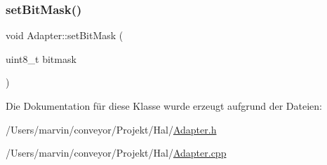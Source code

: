 \hypertarget{class_adapter_adff950a92be7f52dbe08ff3af766a562}{}\label{class_adapter_adff950a92be7f52dbe08ff3af766a562} 
\subsubsection{\texorpdfstring{set\+Bit\+Mask()}{setBitMask()}}
{\footnotesize\ttfamily void Adapter\+::set\+Bit\+Mask (\begin{DoxyParamCaption}\item[{uint8\+\_\+t}]{bitmask }\end{DoxyParamCaption})}



Die Dokumentation für diese Klasse wurde erzeugt aufgrund der Dateien\+:\begin{DoxyCompactItemize}
\item 
/\+Users/marvin/conveyor/\+Projekt/\+Hal/\hyperlink{_adapter_8h}{Adapter.\+h}\item 
/\+Users/marvin/conveyor/\+Projekt/\+Hal/\hyperlink{_adapter_8cpp}{Adapter.\+cpp}\end{DoxyCompactItemize}
